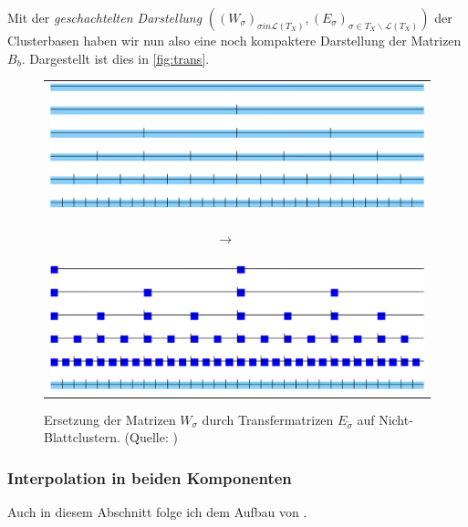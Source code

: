     Mit der \textit{geschachtelten Darstellung} $\left(\left(W_\sigma\right)_{\sigma in \mathcal{L}\left(T_X\right)} , \left(E_\sigma\right)_{\sigma \in T_X \backslash \mathcal{L}\left(T_X\right)}\right)$ der Clusterbasen haben wir nun also eine 
    noch kompaktere Darstellung der Matrizen $B_b$. Dargestellt ist dies in \autoref{fig:trans}.
    
    \begin{figure}[t]
      \begin{tabular}{c}
	\includegraphics{img/cbaum_full.png}\\
	
	\begin{turn}{-90} $\longrightarrow$ \ \ \  \end{turn}\\
	
	\includegraphics{img/cbaum_transfer.png}
      \end{tabular}
      \caption{Ersetzung der Matrizen $W_\sigma$ durch Transfermatrizen $E_{\tilde \sigma}$ auf Nicht-Blattclustern. (Quelle: \citet{h2slides})}
      \label{fig:trans}
    \end{figure}

    \subsubsection{Interpolation in beiden Komponenten}
    Auch in diesem Abschnitt folge ich dem Aufbau von \citet{nichtlokop}.
    
